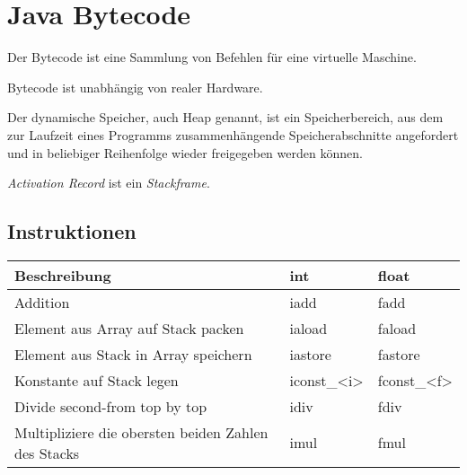 \chapter{Java Bytecode}
\begin{definition}[Bytecode]%
    Der Bytecode ist eine Sammlung von Befehlen für eine virtuelle Maschine.
\end{definition}

Bytecode ist unabhängig von realer Hardware.

\begin{definition}[Heap]%
    Der dynamische Speicher, auch Heap genannt, ist ein Speicherbereich, aus dem
    zur Laufzeit eines Programms zusammenhängende Speicherabschnitte angefordert
    und in beliebiger Reihenfolge wieder freigegeben werden können.
\end{definition}

\textit{Activation Record} ist ein \textit{Stackframe}.
\section{Instruktionen}%
\begin{table}[h]
    \begin{tabular}{p{6cm}|ll}
    \textbf{Beschreibung}                               & \textbf{int} & \textbf{float} \\ \hline
    Addition                                            & iadd         & fadd           \\
    Element aus Array auf Stack packen                  & iaload       & faload         \\
    Element aus Stack in Array speichern                & iastore      & fastore        \\
    Konstante auf Stack legen                           & iconst\_<i>  & fconst\_<f> \\
    Divide second-from top by top                       & idiv         & fdiv           \\
    Multipliziere die obersten beiden Zahlen des Stacks & imul         & fmul           \\
    \end{tabular}
\end{table}

